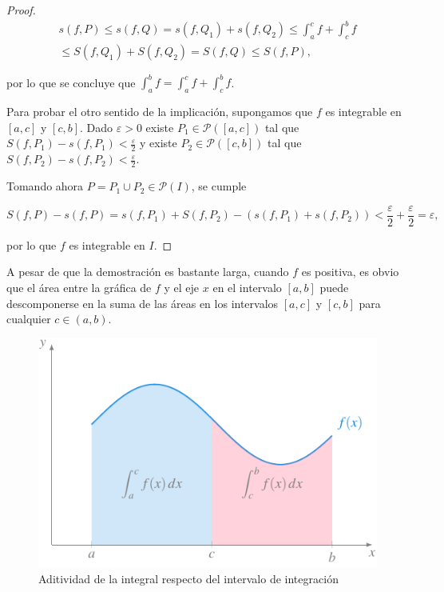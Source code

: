\documentclass[
  a4paper,
]{scrreport}
\theoremstyle{definition}
\theoremstyle{plain}
\theoremstyle{definition}
\theoremstyle{definition}
\theoremstyle{plain}
\theoremstyle{plain}
\theoremstyle{remark}
\begin{document}
\begin{tcolorbox}
\begin{proof}
\[
\begin{gathered}
s(f,P) \leq s(f,Q) = s(f,Q_1) + s(f,Q_2) \leq \int_a^c f + \int_c^b f \\
\leq S(f,Q_1) + S(f,Q_2) = S(f,Q) \leq S(f,P),
\end{gathered}
\]

por lo que se concluye que \(\int_a^b f = \int_a^c f + \int_c^b f\).

Para probar el otro sentido de la implicación, supongamos que \(f\) es
integrable en \([a,c]\) y \([c,b]\). Dado \(\varepsilon>0\) existe
\(P_1\in\mathcal{P}([a,c])\) tal que
\(S(f,P_1)-s(f,P_1)<\frac{\varepsilon}{2}\) y existe
\(P_2\in\mathcal{P}([c,b])\) tal que
\(S(f,P_2)-s(f,P_2)<\frac{\varepsilon}{2}\).

Tomando ahora \(P=P_1\cup P_2\in \mathcal{P}(I)\), se cumple

\[
S(f,P)-s(f,P) = s(f,P_1) + S(f,P_2) - (s(f,P_1) + s(f,P_2)) < \frac{\varepsilon}{2}+\frac{\varepsilon}{2} =\varepsilon,
\]

por lo que \(f\) es integrable en \(I\).
\end{proof}

\end{tcolorbox}

A pesar de que la demostración es bastante larga, cuando \(f\) es
positiva, es obvio que el área entre la gráfica de \(f\) y el eje \(x\)
en el intervalo \([a,b]\) puede descomponerse en la suma de las áreas en
los intervalos \([a,c]\) y \([c,b]\) para cualquier \(c\in(a,b)\).

\begin{figure}[H]

{\centering \includegraphics{img/integrales/aditividad-integral.pdf}

}

\caption{Aditividad de la integral respecto del intervalo de
integración}

\end{figure}%
\end{document}
